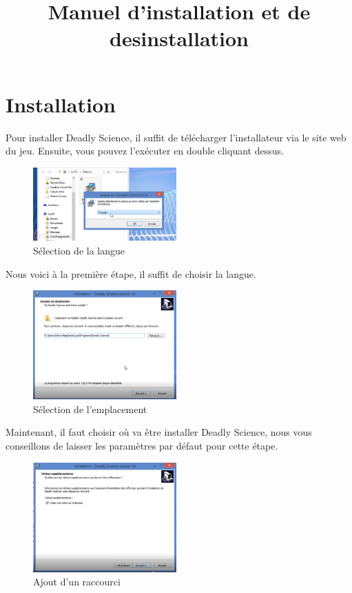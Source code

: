 \documentclass{article}
\title{Manuel d'installation et de desinstallation}
\begin{document}
\maketitle
\tableofcontents

\newpage
\section{Installation}

Pour installer Deadly Science, il suffit de télécharger l'installateur via le site web du jeu. Ensuite, vous pouvez l'exécuter en double cliquant dessus.

\begin{figure}[H]
	\centering
	\includegraphics[width=0.49\textwidth]{setup/inst_1.png}
	\caption{Sélection de la langue}
	\label{setup_0}
\end{figure}

Nous voici à la première étape, il suffit de choisir la langue.

\begin{figure}[H]
	\centering
	\includegraphics[width=0.49\textwidth]{setup/inst_2.png}
	\caption{Sélection de l'emplacement}
	\label{setup_1}
\end{figure}

Maintenant, il faut choisir où va être installer Deadly Science, nous vous conseillons de laisser les paramètres par défaut pour cette étape.

\begin{figure}[H]
	\centering
	\includegraphics[width=0.49\textwidth]{setup/inst_3.png}
	\caption{Ajout d'un raccourci}
	\label{setup_2}
\end{figure}
\end{document}

